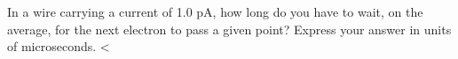 In a wire carrying a current of 1.0 pA, how long do
        you have to wait, on the average, for the next electron to
        pass a given point? Express your answer in units of microseconds.
        <%
